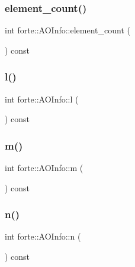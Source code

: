 \subsubsection{\texorpdfstring{element\+\_\+count()}{element\_count()}}
{\footnotesize\ttfamily int forte\+::\+A\+O\+Info\+::element\+\_\+count (\begin{DoxyParamCaption}{ }\end{DoxyParamCaption}) const\hspace{0.3cm}{\ttfamily [inline]}}

\mbox{\label{classforte_1_1_a_o_info_a51797dafa01c915f57b0c910d7e29d23}} 
\subsubsection{\texorpdfstring{l()}{l()}}
{\footnotesize\ttfamily int forte\+::\+A\+O\+Info\+::l (\begin{DoxyParamCaption}{ }\end{DoxyParamCaption}) const\hspace{0.3cm}{\ttfamily [inline]}}

\mbox{\label{classforte_1_1_a_o_info_a4c08f15cd83b5d3cb1735144d3f822c8}} 
\subsubsection{\texorpdfstring{m()}{m()}}
{\footnotesize\ttfamily int forte\+::\+A\+O\+Info\+::m (\begin{DoxyParamCaption}{ }\end{DoxyParamCaption}) const\hspace{0.3cm}{\ttfamily [inline]}}

\mbox{\label{classforte_1_1_a_o_info_a71492e38fe610c5535809789eceea740}} 
\subsubsection{\texorpdfstring{n()}{n()}}
{\footnotesize\ttfamily int forte\+::\+A\+O\+Info\+::n (\begin{DoxyParamCaption}{ }\end{DoxyParamCaption}) const\hspace{0.3cm}{\ttfamily [inline]}}

